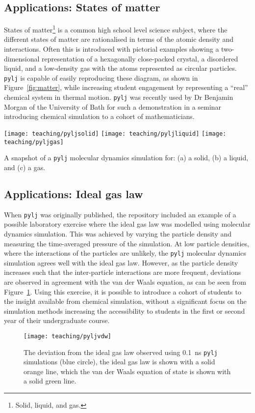 \subsection{Applications: States of matter}
States of matter\footnote{Solid, liquid, and gas.} is a common high school level science subject, where the different states of matter are rationalised in terms of the atomic density and interactions.
Often this is introduced with pictorial examples showing a two-dimensional representation of a hexagonally close-packed crystal, a disordered liquid, and a low-density gas with the atoms represented as circular particles.
\texttt{pylj} is capable of easily reproducing these diagram, as shown in Figure~\ref{fig:matter}, while increasing student engagement by representing a ``real'' chemical system in thermal motion.
\texttt{pylj} was recently used by Dr Benjamin Morgan of the University of Bath for such a demonstration in a seminar introducing chemical simulation to a cohort of mathematicians.
%
\begin{marginfigure}
    \centering
    \texttt{[image: teaching/pyljsolid]}
    \texttt{[image: teaching/pyljliquid]}
    \texttt{[image: teaching/pyljgas]}
    \caption{A snapshot of a \texttt{pylj} molecular dynamics simulation for: (a) a solid, (b) a liquid, and (c) a gas.}
    \label{fig:matter}
\end{marginfigure}
%

\subsection{Applications: Ideal gas law}
When \texttt{pylj} was originally published,\autocite{mccluskey_pylj_2018} the repository included an example of a possible laboratory exercise where the ideal gas law was modelled using molecular dynamics simulation.
This was achieved by varying the particle density and measuring the time-averaged pressure of the simulation.
At low particle densities, where the interactions of the particles are unlikely, the \texttt{pylj} molecular dynamics simulation agrees well with the ideal gas law.
However, as the particle density increases such that the inter-particle interactions are more frequent, deviations are observed in agreement with the van der Waals equation, as can be seen from Figure~\ref{fig:vdw}.
Using this exercise, it is possible to introduce a cohort of students to the insight available from chemical simulation, without a significant focus on the simulation methods increasing the accessibility to students in the first or second year of their undergraduate course.
%
\begin{figure}
    \centering
    \texttt{[image: teaching/pyljvdw]}
    \caption{The deviation from the ideal gas law observed using \SI{0.1}{\nano\second} \texttt{pylj} simulations (blue circle), the ideal gas law is shown with a solid orange line, which the van der Waals equation of state is shown with a solid green line.}
    \label{fig:vdw}
\end{figure}
%

